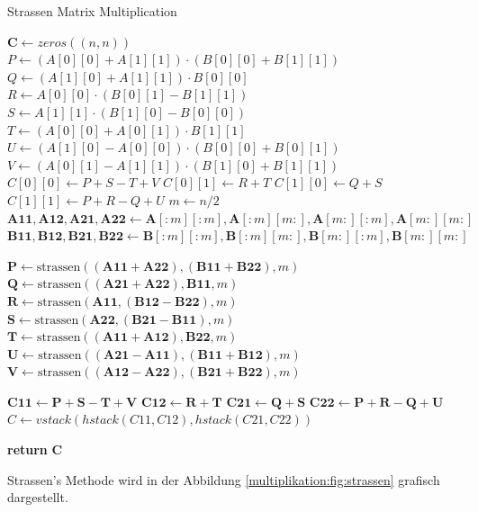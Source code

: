 \begin{algorithm}\caption{Strassen Matrix Multiplication}
	\label{multiplikation:alg:strassen}
	\setlength{\lineskip}{7pt}
	\begin{algorithmic}
		\State  $ \mathbf{C} \gets zeros((n, n))$
		\State $P  \gets (A[0][0]+A[1][1])\cdot( B[0][0]+B[1][1])$
		\State   $Q  \gets (A[1][0]+A[1][1])\cdot B[0][0]$
		\State   $R  \gets A[0][0]\cdot (B[0][1]-B[1][1])$
		\State   $S  \gets A[1][1]\cdot (B[1][0]-B[0][0])$
		\State   $T  \gets (A[0][0]+A[0][1])\cdot B[1][1]$
		\State   $U  \gets (A[1][0]-A[0][0])\cdot (B[0][0]+B[0][1])$
		\State   $V  \gets (A[0][1]-A[1][1])\cdot (B[1][0]+B[1][1])$
		\State   $C[0][0]  \gets P+S-T+V$
		\State   $C[0][1]  \gets R+T$
		\State   $C[1][0]  \gets Q+S$
		\State   $C[1][1]  \gets P+R-Q+U$
		\Else
		\State  $ m \gets n/2$
		\State $\mathbf{A11}, \mathbf{A12}, \mathbf{A21}, \mathbf{A22} \gets \mathbf{A}[:m][:m], \mathbf{A}[:m][m:], \mathbf{A}[m:][:m], \mathbf{A}[m:][m:]$
		\State $\mathbf{B11}, \mathbf{B12}, \mathbf{B21}, \mathbf{B22} \gets \mathbf{B}[:m][:m], \mathbf{B}[:m][m:], \mathbf{B}[m:][:m], \mathbf{B}[m:][m:]$

		\State $ \mathbf{P} \gets \text{strassen}((\mathbf{A11}+ \mathbf{A22}),(\mathbf{B11}+\mathbf{B22}), m)$
		\State $ \mathbf{Q} \gets \text{strassen}((\mathbf{A21}+ \mathbf{A22}), \mathbf{B11},m)$
		\State $ \mathbf{R} \gets \text{strassen}( \mathbf{A11},(\mathbf{B12}-  \mathbf{B22}),m)$
		\State $ \mathbf{S} \gets \text{strassen}( \mathbf{A22},(\mathbf{B21}-  \mathbf{B11}),m)$
		\State $ \mathbf{T} \gets \text{strassen}((\mathbf{A11}+ \mathbf{A12}), \mathbf{B22},m)$
		\State $ \mathbf{U} \gets \text{strassen}((\mathbf{A21}- \mathbf{A11}),(\mathbf{B11}+\mathbf{B12}),m)$
		\State $ \mathbf{V} \gets \text{strassen}((\mathbf{A12}- \mathbf{A22}),(\mathbf{B21}+\mathbf{B22}),m)$



		\State   $\mathbf{C11}  \gets \mathbf{P+S-T+V}$
		\State   $\mathbf{C12}  \gets \mathbf{R+T}$
		\State   $\mathbf{C21}  \gets \mathbf{Q+S}$
		\State   $\mathbf{C22}  \gets \mathbf{P+R-Q+U}$
		\State $  C \gets vstack(hstack(C11, C12), hstack(C21, C22))$

		\EndIf
		\State \textbf{return} $\textbf{C}$

		\EndFunction
	\end{algorithmic}
\end{algorithm}
Strassen's Methode wird in der Abbildung \ref{multiplikation:fig:strassen} grafisch dargestellt.
